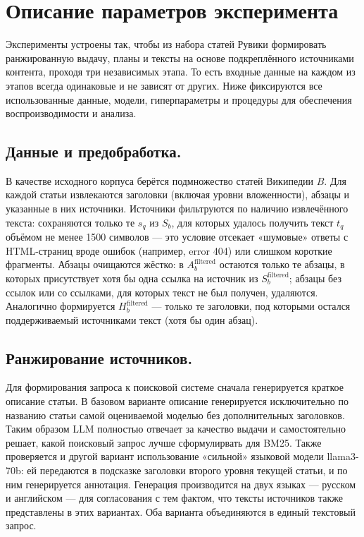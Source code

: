 \documentclass{article}
\theoremstyle{definition}
\theoremstyle{plain}
\begin{document}
\section*{Описание параметров эксперимента}

Эксперименты устроены так, чтобы из набора статей Рувики формировать ранжированную выдачу, планы и тексты на основе подкреплённого источниками контента, проходя три независимых этапа.
То есть входные данные на каждом из этапов всегда одинаковые и не зависят от других.
Ниже фиксируются все использованные данные, модели, гиперпараметры и процедуры для обеспечения воспроизводимости и анализа.

\subsection*{Данные и предобработка.}
В качестве исходного корпуса берётся подмножество статей Википедии \(B\). Для каждой статьи извлекаются заголовки (включая уровни вложенности), абзацы и указанные в них источники. 
Источники фильтруются по наличию извлечённого текста: сохраняются только те \(s_q\) из \(S_b\), для которых удалось получить текст \(t_q\) объёмом не менее 1500 символов — это условие отсекает «шумовые» ответы с HTML-страниц вроде ошибок (например, error 404) или слишком короткие фрагменты. 
Абзацы очищаются жёстко: в \(A_b^{\mathrm{filtered}}\) остаются только те абзацы, в которых присутствует хотя бы одна ссылка на источник из \(S_b^{\mathrm{filtered}}\); абзацы без ссылок или со ссылками, для которых текст не был получен, удаляются. 
Аналогично формируется \(H_b^{\mathrm{filtered}}\) — только те заголовки, под которыми остался поддерживаемый источниками текст (хотя бы один абзац).

\subsection*{Ранжирование источников.}
Для формирования запроса к поисковой системе сначала генерируется краткое описание статьи.  
В базовом варианте описание генерируется исключительно по названию статьи самой оцениваемой моделью без дополнительных заголовков.
Таким образом LLM полностью отвечает за качество выдачи и самостоятельно решает, какой поисковый запрос лучше сформулирвать для BM25.
Также проверяется и другой вариант использование «сильной» языковой модели llama3-70b: ей передаются в подсказке заголовки второго уровня текущей статьи, и по ним генерируется аннотация. 
Генерация производится на двух языках — русском и английском — для согласования с тем фактом, что тексты источников также представлены в этих вариантах. 
Оба варианта объединяются в единый текстовый запрос.
\end{document}
